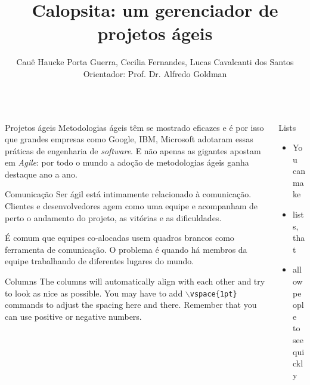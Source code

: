 \documentclass[serif,mathserif,final]{beamer}
\title{Calopsita: um gerenciador de projetos ágeis}
\author{Cauê Haucke Porta Guerra, Cecilia Fernandes, Lucas Cavalcanti dos Santos\\ Orientador: Prof. Dr. Alfredo Goldman}
\institute{Instituto de Matemática e Estatística\\
Universidade de São Paulo}
\begin{document}
\begin{frame}{}
  \begin{columns}[t]

    \begin{column}{0.32\linewidth}

      \begin{block}{Projetos ágeis}
		Metodologias ágeis têm se mostrado eficazes e é por isso que grandes 
		empresas como Google, IBM, Microsoft adotaram essas práticas de 
		engenharia de \textit{software}. E não apenas as gigantes apostam em 
		\textit{Agile}: por todo o mundo a adoção de metodologias ágeis ganha 
		destaque ano a ano. 
      \end{block}

      \begin{block}{Comunicação}
        Ser ágil está intimamente relacionado à comunicação. Clientes e 
		desenvolvedores agem como uma equipe e acompanham de perto o andamento 
		do projeto, as vitórias e as dificuldades.
	
		\vspace{1pt}

		É comum que equipes co-alocadas usem quadros brancos como ferramenta de 
		comunicação. O problema é quando há membros da equipe trabalhando de 
		diferentes lugares do mundo.
      \end{block}

      \begin{block}{Columns}
        The columns will automatically align with each other and try to look
        as nice as possible.  You may have to add {\tt$\backslash$vspace\{1pt\}}
        commands to adjust the spacing here and there.  Remember that you can
        use positive or negative numbers.
      \end{block}

    \end{column}%

    \begin{column}{0.32\linewidth}

      \begin{block}{Lists}
        \begin{itemize}
          \item You can make
          \item lists, that
          \item allow people to see quickly
        \end{itemize}
      \end{block}


\end{column}
\end{columns}
\end{frame}
\end{document}
